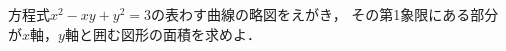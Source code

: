 \documentclass[../../main.tex]{subfiles}
\begin{document}
方程式$x^2-xy+y^2=3$の表わす曲線の略図をえがき，
その第1象限にある部分が$x$軸，$y$軸と囲む図形の面積を求めよ．
\end{document}
